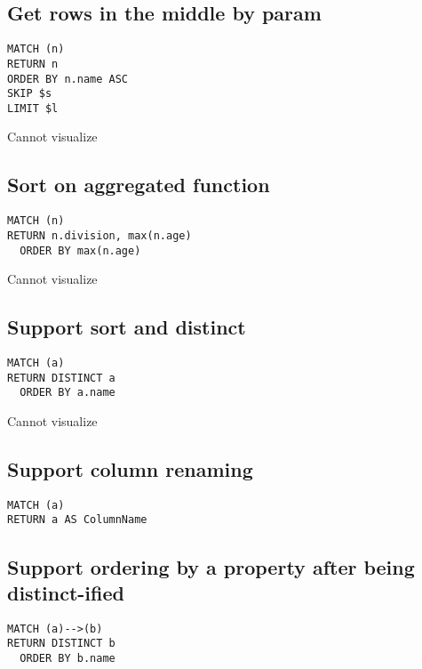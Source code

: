 \subsection{Get rows in the middle by param}

\begin{lstlisting}
MATCH (n)
RETURN n
ORDER BY n.name ASC
SKIP $s
LIMIT $l
\end{lstlisting}

Cannot visualize
\subsection{Sort on aggregated function}

\begin{lstlisting}
MATCH (n)
RETURN n.division, max(n.age)
  ORDER BY max(n.age)
\end{lstlisting}

Cannot visualize
\subsection{Support sort and distinct}

\begin{lstlisting}
MATCH (a)
RETURN DISTINCT a
  ORDER BY a.name
\end{lstlisting}

Cannot visualize
\subsection{Support column renaming}

\begin{lstlisting}
MATCH (a)
RETURN a AS ColumnName
\end{lstlisting}

\subsection{Support ordering by a property after being distinct-ified}

\begin{lstlisting}
MATCH (a)-->(b)
RETURN DISTINCT b
  ORDER BY b.name
\end{lstlisting}

